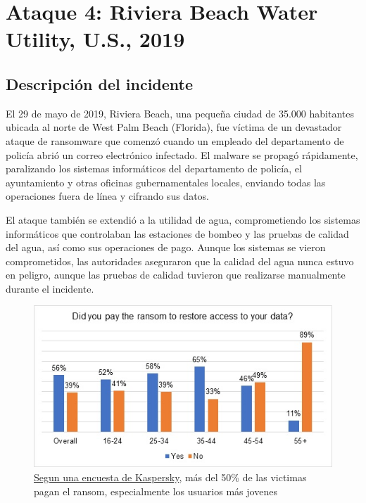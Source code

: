 \newpage
\section{Ataque 4: Riviera Beach Water Utility, U.S., 2019}

\subsection{Descripción del incidente}
El 29 de mayo de 2019, Riviera Beach, una pequeña ciudad de 35.000 habitantes ubicada al norte de West Palm Beach (Florida), fue víctima de un devastador ataque de ransomware que comenzó cuando un empleado del departamento de policía abrió un correo electrónico infectado. El malware se propagó rápidamente, paralizando los sistemas informáticos del departamento de policía, el ayuntamiento y otras oficinas gubernamentales locales, enviando todas las operaciones fuera de línea y cifrando sus datos.

El ataque también se extendió a la utilidad de agua, comprometiendo los sistemas informáticos que controlaban las estaciones de bombeo y las pruebas de calidad del agua, así como sus operaciones de pago. Aunque los sistemas se vieron comprometidos, las autoridades aseguraron que la calidad del agua nunca estuvo en peligro, aunque las pruebas de calidad tuvieron que realizarse manualmente durante el incidente.


\begin{figure}[htbp]
    \centering
    \includegraphics{images/ransom.jpg}
    \caption{\href{https://www.kaspersky.com/about/press-releases/over-half-of-ransomware-victims-pay-the-ransom-but-only-a-quarter-see-their-full-data-returned}{Segun una encuesta de Kaspersky}, más del 50\% de las victimas pagan el ransom, especialmente los usuarios más jovenes}
    \label{fig:ransom}
\end{figure}


